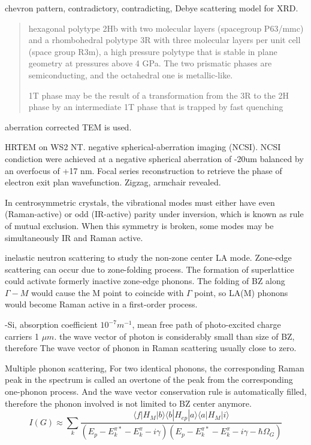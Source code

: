 chevron pattern, contradictory, contradicting, Debye scattering model for XRD.

\begin{quote}
hexagonal polytype 2Hb with two molecular layers (spacegroup P63/mmc) and a rhombohedral polytype 3R with three molecular layers per unit cell (space group R3m), a high pressure polytype that is stable in plane geometry at pressures above 4 GPa. The two prismatic phases are semiconducting, and the octahedral one is metallic-like.

1T phase may be the result of a transformation from the 3R to the 2H phase by an intermediate 1T phase that is trapped by fast quenching

\end{quote}

aberration corrected TEM is used.

HRTEM on WS2 NT.\cite{Sadan2008} negative spherical-aberration imaging (NCSI). NCSI condiction were achieved at a negative spherical aberration of -20um balanced by an overfocus of +17 nm. Focal series reconstruction to retrieve the phase of electron exit plan wavefunction. Zigzag, armchair revealed.


In centrosymmetric crystals, the vibrational modes must either have even (Raman-active) or odd (IR-active) parity under inversion, which is known as rule of mutual exclusion. When this symmetry is broken, some modes may be simultaneously IR and Raman active.

inelastic neutron scattering to study the non-zone center LA mode. Zone-edge scattering can occur due to zone-folding process. The formation of superlattice could activate formerly inactive zone-edge phonons. The folding of BZ along $\Gamma-M$ would cause the M point to coincide with $\Gamma$ point, so LA(M) phonons would become Raman active in a first-order process.


-Si,  absorption coefficient $10^{-7}m^{-1}$, mean free path of photo-excited charge carriers 1 $\mu m$. the wave vector of photon is considerably small than size of BZ, therefore The wave vector of phonon in Raman scattering usually close to zero.

Multiple phonon scattering, For two identical phonons, the corresponding Raman peak in the spectrum is called an overtone of the peak from the corresponding one-phonon process. And the wave vector conservation rule is automatically filled, therefore the phonon involved is not limited to BZ center anymore.
\[
I(G) \approx \sum_k \frac{\langle f|H_M|b\rangle \langle b|H_{ep}|a\rangle \langle a|H_M|i\rangle}{(E_p - E_k^{\pi *}- E_k^{\pi}-i\gamma)(E_p - E_k^{\pi *}- E_k^{\pi}-i\gamma- \hbar\Omega_{G})}
\]

